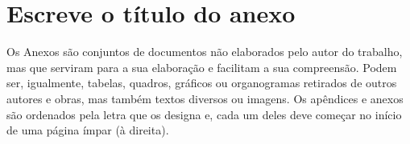 
\chapter{Escreve o título do anexo} %

\label{AnnexA} %

Os Anexos são conjuntos de documentos não elaborados pelo autor do trabalho,
mas que serviram para a sua elaboração e facilitam a sua compreensão. Podem ser,
igualmente, tabelas, quadros, gráficos ou organogramas retirados de outros autores e
obras, mas também textos diversos ou imagens.
Os apêndices e anexos são ordenados pela letra que os designa e, cada um deles deve
começar no início de uma página ímpar (à direita).